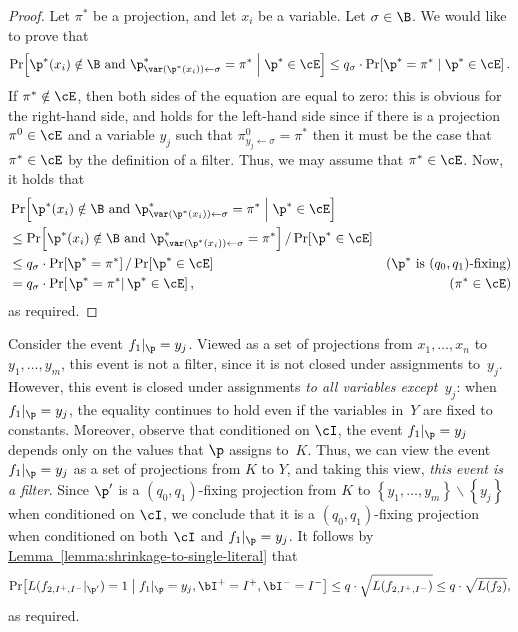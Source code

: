 \documentclass[11pt]{article}
\numberwithin{equation}{section}
\theoremstyle{definition}
\theoremstyle{plain}
\newcommand{\expref}[2]{\hyperref[#2]{#1~\ref{#2}}}
\theoremstyle{definition}\newtheorem{notation}[theorem]{Notation}\theoremstyle{plain}
\begin{document}
\begin{proof}
Let $\pi^{*}$ be a projection, and let $x_{i}$ be a variable. Let
$\sigma\in\B$. We would like to prove that 
\[
\Pr\!\left[\p^{*}(x_{i})\notin\B\text{ and }\p_{\var(\p^{*}(x_{i}))\gets\sigma}^{*}=\pi^{*}\;\middle|\;\p^{*}\in\cE\right]\le q_{\sigma}\cdot\Pr\!\left[\p^{*}=\pi^{*}\mid\p^{*}\in\cE\right].
\]
If $\pi^{*}\notin\cE$, then both sides of the equation are equal
to zero: this is obvious for the right-hand side, and holds for the
left-hand side since if there is a projection~$\pi^{0}\in\cE$ and
a variable $y_{j}$ such that $\pi_{y_{j}\gets\sigma}^{0}=\pi^{*}$
then it must be the case that $\pi^{*}\in\cE$ by the definition of
a filter. Thus, we may assume that $\pi^{*}\in\cE$. Now, it holds
that 
\begin{align*}
 & \Pr\!\left[\p^{*}(x_{i})\notin\B\text{ and }\p_{\var(\p^{*}(x_{i}))\gets\sigma}^{*}=\pi^{*}\;\middle|\;\p^{*}\in\cE\right]\\
 & \le\Pr\!\left[\p^{*}(x_{i})\notin\B\text{ and }\p_{\var(\p^{*}(x_{i}))\gets\sigma}^{*}=\pi^{*}\right]/\Pr\!\left[\p^{*}\in\cE\right]\\
 & \le q_{\sigma}\cdot\Pr\!\left[\p^{*}=\pi^{*}\right]/\Pr\!\left[\p^{*}\in\cE\right] & \text{(\ensuremath{\p^{*}} is \ensuremath{(q_{0},q_{1})}-fixing)}\\
 & =q_{\sigma}\cdot\Pr\!\left[\left.\p^{*}=\pi^{*}\right|\p^{*}\in\cE\right], & \text{(\ensuremath{\pi^{*}\in\cE})}
\end{align*}
as required. 
\end{proof}
Consider the event $f_{1}|_{\p}=y_{j}$. Viewed as a set of projections
from $x_{1},\ldots,x_{n}$ to $y_{1},\ldots,y_{m}$, this event is
not a filter, since it is not closed under assignments to~$y_{j}$.
However, this event is closed under assignments \emph{to all variables
except~$y_{j}$}: when $f_{1}|_{\p}=y_{j}$, the equality continues
to hold even if the variables in~$Y$ are fixed to constants. Moreover,
observe that conditioned on $\cI$, the event $f_{1}|_{\p}=y_{j}$
depends only on the values that $\p$ assigns to~$K$. Thus, we can
view the event $f_{1}|_{\p}=y_{j}$ as a set of projections from $K$
to $Y$, and taking this view, \emph{this event is a filter}. Since
$\p'$ is a $(q_{0},q_{1})$-fixing projection from $K$ to $\left\{ y_{1},\ldots,y_{m}\right\} \backslash\left\{ y_{j}\right\} $
when conditioned on $\cI$, we conclude that it is a $(q_{0},q_{1})$-fixing
projection when conditioned on both $\cI$ and $f_{1}|_{\p}=y_{j}$.
It follows by \expref{Lemma}{lemma:shrinkage-to-single-literal} that 
\[
\Pr\!\left[L(f_{2,I^{+},I^{-}}|_{\p'})=1\;\middle|\;f_{1}|_{\p}=y_{j},\bI^{+}=I^{+},\bI^{-}=I^{-}\right]\le q\cdot\sqrt{L(f_{2,I^{+},I^{-}})}\le q\cdot\sqrt{L(f_{2})},
\]
as required.
\end{document}

